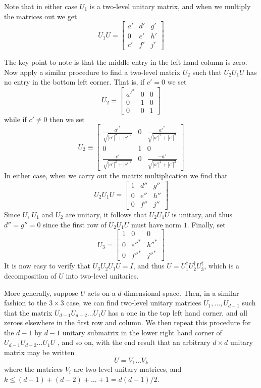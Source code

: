 Note that in either case $U_1$ is a two-level unitary matrix, and when we multiply the matrices out we get
$$U_1U = \begin{bmatrix}
a'&d'&g'\\
0&e'&h'\\
c'&f'&j'
\end{bmatrix}$$

The key point to note is that the middle entry in the left hand column is zero. Now apply a similar procedure to find a two-level matrix $U_2$ such that $U_2U_1U$ has no entry in the bottom left corner. That is, if $c' = 0$ we set
$$U_2 \equiv \begin{bmatrix}a'^\ast&0&0\\0&1&0\\0&0&1\end{bmatrix}$$
while if $c' \neq 0$ then we set
$$U_2 \equiv \begin{bmatrix}
\frac{a'^\ast}{\sqrt{|a'|^2+|c'|^2}} &0& \frac{a'^\ast}{\sqrt{|a'|^2+|c'|^2}}\\
0&1&0\\
\frac{c'}{\sqrt{|a'|^2+|c'|^2}} &0& \frac{-a'}{\sqrt{|a'|^2+|c'|^2}}
\end{bmatrix}$$
In either case, when we carry out the matrix multiplication we find that
$$U_2U_1U = \begin{bmatrix}
1&d''&g''\\
0&e''&h''\\
0&f''&j''
\end{bmatrix}$$
Since $U$, $U_1$ and $U_2$ are unitary, it follows that $U_2U_1U$ is unitary, and thus $d'' = g'' = 0$ since the first row of $U_2U_1U$ must have norm $1$. Finally, set
$$U_3 = \begin{bmatrix}
1&0&0\\
0&e''^\ast&h''^\ast\\
0&f''^\ast&j''^\ast
\end{bmatrix}$$
It is now easy to verify that $U_3U_2U_1U = I$, and thus $U = U_1^\dag U_2^\dag U_3^\dag$, which is a decomposition of $U$ into two-level unitaries.
\vspace{1em}

More generally, suppose $U$ acts on a $d$-dimensional space. Then, in a similar fashion to the $3\times 3$ case, we can find two-level unitary matrices $U_1, \dots , U_{d-1}$ such that the matrix $U_{d-1}U_{d-2}\dots U_1U$ has a one in the top left hand corner, and all zeroes elsewhere in the first row and column. We then repeat this procedure for the $d - 1$ by $d - 1$ unitary submatrix in the lower right hand corner of $U_{d-1}U_{d-2}\dots U_1U$ , and so on, with the end result that an arbitrary $d\times d$ unitary matrix may be written
$$U = V_1\dots V_k$$
where the matrices $V_i$ are two-level unitary matrices, and $k \leq (d - 1) + (d - 2) + \dots + 1 = d(d-1)/2$.

